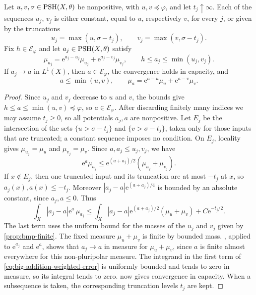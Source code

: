 \begin{lemma}\label{lem:big-truncated-addition-limit}
Let $u,v,\sigma\in\mathrm{PSH}(X,\theta)$ be nonpositive, with $u,v\preceq\varphi$, and let $t_j\uparrow\infty$. Each of the sequences $u_j$, $v_j$ is either constant, equal to $u$, respectively $v$, for every $j$, or given by the truncations
\[
 u_j=\max(u,\sigma-t_j),\qquad
 v_j=\max(v,\sigma-t_j).
\]
Fix $h\in\mathcal E_\varphi$ and let $a_j\in\mathrm{PSH}(X,\theta)$ satisfy
\[
 \mu_{a_j}=\mathrm{e}^{a_j-u_j}\mu_{u_j}+\mathrm{e}^{a_j-v_j}\mu_{v_j},
 \qquad h\leq a_j\leq\min(u_j,v_j).
\]
If $a_j\to a$ in $L^1(X)$, then $a\in\mathcal E_\varphi$, the convergence holds in capacity, and
\[
 a\leq\min(u,v),\qquad
 \mu_a=\mathrm{e}^{a-u}\mu_u+\mathrm{e}^{a-v}\mu_v.
\]
\end{lemma}
\begin{proof}
Since $u_j$ and $v_j$ decrease to $u$ and $v$, the bounds give $h\leq a\leq\min(u,v)\preceq\varphi$, so $a\in\mathcal E_\varphi$. After discarding finitely many indices we may assume $t_j\geq0$, so all potentials $a_j,a$ are nonpositive. Let $E_j$ be the intersection of the sets $\{u>\sigma-t_j\}$ and $\{v>\sigma-t_j\}$, taken only for those inputs that are truncated; a constant sequence imposes no condition. On $E_j$, locality gives $\mu_{u_j}=\mu_u$ and $\mu_{v_j}=\mu_v$. Since $a,a_j\leq u_j,v_j$, we have
\[
 \mathrm{e}^a\mu_{a_j}
 \leq \mathrm{e}^{(a+a_j)/2}(\mu_{u_j}+\mu_{v_j}).
\]
If $x\notin E_j$, then one truncated input and its truncation are at most $-t_j$ at $x$, so $a_j(x),a(x)\leq-t_j$. Moreover $|a_j-a|\mathrm{e}^{(a+a_j)/4}$ is bounded by an absolute constant, since $a_j,a\leq0$. Thus
\begin{equation}\label{eq:big-addition-weighted-error}
 \int_X|a_j-a|\mathrm{e}^a\,\mu_{a_j}
 \leq\int_X|a_j-a|\mathrm{e}^{(a+a_j)/2}(\mu_u+\mu_v)
       +C \mathrm{e}^{-t_j/2}.
\end{equation}
The last term uses the uniform bound for the masses of the $u_j$ and $v_j$ given by \cref{prop:bmp-finite}. The fixed measure $\mu_u+\mu_v$ is finite by bounded mass. , applied to $\mathrm{e}^{a_j}$ and $\mathrm{e}^a$, shows that $a_j\to a$ in measure for $\mu_u+\mu_v$, since $a$ is finite almost everywhere for this non-pluripolar measure. The integrand in the first term of \eqref{eq:big-addition-weighted-error} is uniformly bounded and tends to zero in measure, so its integral tends to zero.  now gives convergence in capacity. When a subsequence is taken, the corresponding truncation levels $t_j$ are kept.


\end{proof}
